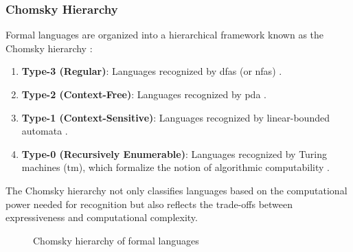 \subsubsection{Chomsky Hierarchy}
Formal languages are organized into a hierarchical framework known as the Chomsky hierarchy \cite{chomsky1956three, hopcroft2006introduction}:
\begin{enumerate}
    \item \textbf{Type-3 (Regular)}: Languages recognized by \glspl{dfa} (or \glspl{nfa}) \cite{hopcroft2006introduction}.
    \item \textbf{Type-2 (Context-Free)}: Languages recognized by \gls{pda} \cite{chomsky1956three}.
    \item \textbf{Type-1 (Context-Sensitive)}: Languages recognized by linear-bounded automata \cite{chomsky1956three}.
    \item \textbf{Type-0 (Recursively Enumerable)}: Languages recognized by Turing machines (\gls{tm}), which formalize the notion of algorithmic computability \cite{hopcroft2006introduction, turing1936computable}.
\end{enumerate}

\begin{concept}
The Chomsky hierarchy not only classifies languages based on the computational power needed for recognition but also reflects the trade-offs between expressiveness and computational complexity.
\end{concept}

\begin{figure}[h]
    \centering
    \caption{Chomsky hierarchy of formal languages}
    \label{fig:chomsky-hierarchy}
\end{figure}

